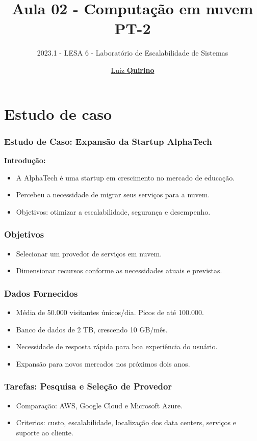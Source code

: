\documentclass{beamer}
\title{Aula 02 - Computação em nuvem PT-2}
\subtitle{2023.1 - LESA 6 -  Laboratório de Escalabilidade de Sistemas}
\author{\href{mailto:luiz.quirino@ifsp.edu.br}{Luiz \textbf{Quirino}}}
\begin{document}
\maketitle
{}
\section{Estudo de caso}
\begin{frame}
      \frametitle{Estudo de Caso: Expansão da Startup AlphaTech}
      \textbf{Introdução:}
      \begin{itemize}
          \item A AlphaTech é uma startup em crescimento no mercado de educação.
          \item Percebeu a necessidade de migrar seus serviços para a nuvem.
          \item Objetivos: otimizar a escalabilidade, segurança e desempenho.
      \end{itemize}
      \end{frame}
      
      \begin{frame}
      \frametitle{Objetivos}
      \begin{itemize}
          \item Selecionar um provedor de serviços em nuvem.
          \item Dimensionar recursos conforme as necessidades atuais e previstas.
      \end{itemize}
      \end{frame}
      
      \begin{frame}
      \frametitle{Dados Fornecidos}
      \begin{itemize}
          \item Média de 50.000 visitantes únicos/dia. Picos de até 100.000.
          \item Banco de dados de 2 TB, crescendo 10 GB/mês.
          \item Necessidade de resposta rápida para boa experiência do usuário.
          \item Expansão para novos mercados nos próximos dois anos.
      \end{itemize}
      \end{frame}
      
      \begin{frame}
      \frametitle{Tarefas: Pesquisa e Seleção de Provedor}
      \begin{itemize}
          \item Comparação: AWS, Google Cloud e Microsoft Azure.
          \item Criterios: custo, escalabilidade, localização dos data centers, serviços e suporte ao cliente.
      \end{itemize}
      \end{frame}
      
\end{document}
